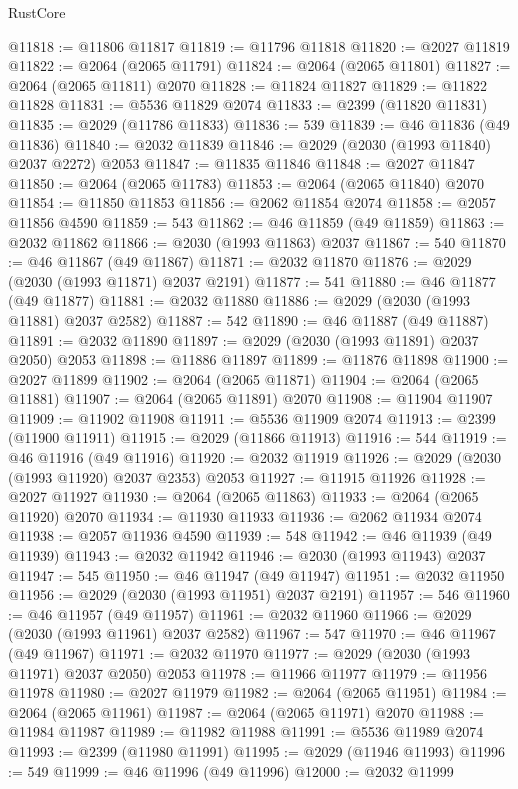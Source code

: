 \begin{lexlean}{RustCore}
\begin{coremodule}
@11818 := @11806 @11817
@11819 := @11796 @11818
@11820 := @2027 @11819
@11822 := @2064 (@2065 @11791)
@11824 := @2064 (@2065 @11801)
@11827 := @2064 (@2065 @11811) @2070
@11828 := @11824 @11827
@11829 := @11822 @11828
@11831 := @5536 @11829 @2074
@11833 := @2399 (@11820 @11831)
@11835 := @2029 (@11786 @11833)
@11836 := 539
@11839 := @46 @11836 (@49 @11836)
@11840 := @2032 @11839
@11846 := @2029 (@2030 (@1993 @11840) @2037 @2272) @2053
@11847 := @11835 @11846
@11848 := @2027 @11847
@11850 := @2064 (@2065 @11783)
@11853 := @2064 (@2065 @11840) @2070
@11854 := @11850 @11853
@11856 := @2062 @11854 @2074
@11858 := @2057 @11856 @4590
@11859 := 543
@11862 := @46 @11859 (@49 @11859)
@11863 := @2032 @11862
@11866 := @2030 (@1993 @11863) @2037
@11867 := 540
@11870 := @46 @11867 (@49 @11867)
@11871 := @2032 @11870
@11876 := @2029 (@2030 (@1993 @11871) @2037 @2191)
@11877 := 541
@11880 := @46 @11877 (@49 @11877)
@11881 := @2032 @11880
@11886 := @2029 (@2030 (@1993 @11881) @2037 @2582)
@11887 := 542
@11890 := @46 @11887 (@49 @11887)
@11891 := @2032 @11890
@11897 := @2029 (@2030 (@1993 @11891) @2037 @2050) @2053
@11898 := @11886 @11897
@11899 := @11876 @11898
@11900 := @2027 @11899
@11902 := @2064 (@2065 @11871)
@11904 := @2064 (@2065 @11881)
@11907 := @2064 (@2065 @11891) @2070
@11908 := @11904 @11907
@11909 := @11902 @11908
@11911 := @5536 @11909 @2074
@11913 := @2399 (@11900 @11911)
@11915 := @2029 (@11866 @11913)
@11916 := 544
@11919 := @46 @11916 (@49 @11916)
@11920 := @2032 @11919
@11926 := @2029 (@2030 (@1993 @11920) @2037 @2353) @2053
@11927 := @11915 @11926
@11928 := @2027 @11927
@11930 := @2064 (@2065 @11863)
@11933 := @2064 (@2065 @11920) @2070
@11934 := @11930 @11933
@11936 := @2062 @11934 @2074
@11938 := @2057 @11936 @4590
@11939 := 548
@11942 := @46 @11939 (@49 @11939)
@11943 := @2032 @11942
@11946 := @2030 (@1993 @11943) @2037
@11947 := 545
@11950 := @46 @11947 (@49 @11947)
@11951 := @2032 @11950
@11956 := @2029 (@2030 (@1993 @11951) @2037 @2191)
@11957 := 546
@11960 := @46 @11957 (@49 @11957)
@11961 := @2032 @11960
@11966 := @2029 (@2030 (@1993 @11961) @2037 @2582)
@11967 := 547
@11970 := @46 @11967 (@49 @11967)
@11971 := @2032 @11970
@11977 := @2029 (@2030 (@1993 @11971) @2037 @2050) @2053
@11978 := @11966 @11977
@11979 := @11956 @11978
@11980 := @2027 @11979
@11982 := @2064 (@2065 @11951)
@11984 := @2064 (@2065 @11961)
@11987 := @2064 (@2065 @11971) @2070
@11988 := @11984 @11987
@11989 := @11982 @11988
@11991 := @5536 @11989 @2074
@11993 := @2399 (@11980 @11991)
@11995 := @2029 (@11946 @11993)
@11996 := 549
@11999 := @46 @11996 (@49 @11996)
@12000 := @2032 @11999

\end{coremodule}
\end{lexlean}
